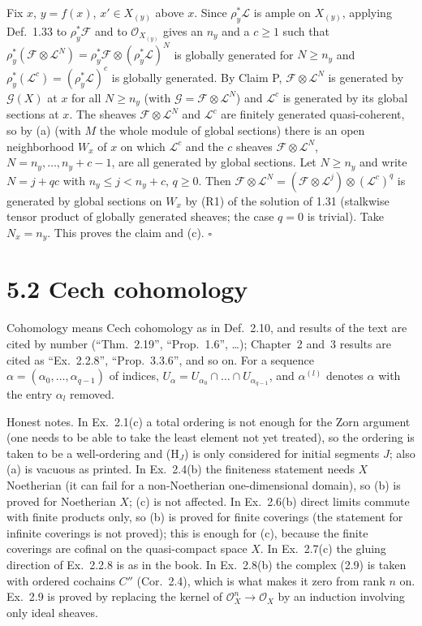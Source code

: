 \documentclass[11pt]{article}
\begin{document}
Fix $x$, $y=f(x)$, $x'\in X_{(y)}$ above $x$. Since $\rho_y^*\mathcal{L}$ is ample on $X_{(y)}$, applying Def.~1.33 to $\rho_y^*\mathcal{F}$ and to $\mathcal{O}_{X_{(y)}}$ gives an $n_y$ and a $c\ge1$ such that $\rho_y^*(\mathcal{F}\otimes\mathcal{L}^N)=\rho_y^*\mathcal{F}\otimes(\rho_y^*\mathcal{L})^N$ is globally generated for $N\ge n_y$ and $\rho_y^*(\mathcal{L}^c)=(\rho_y^*\mathcal{L})^c$ is globally generated. By Claim P, $\mathcal{F}\otimes\mathcal{L}^N$ is generated by $\mathcal{G}(X)$ at $x$ for all $N\ge n_y$ (with $\mathcal{G}=\mathcal{F}\otimes\mathcal{L}^N$) and $\mathcal{L}^c$ is generated by its global sections at $x$. The sheaves $\mathcal{F}\otimes\mathcal{L}^N$ and $\mathcal{L}^c$ are finitely generated quasi-coherent, so by (a) (with $M$ the whole module of global sections) there is an open neighborhood $W_x$ of $x$ on which $\mathcal{L}^c$ and the $c$ sheaves $\mathcal{F}\otimes\mathcal{L}^N$, $N=n_y,\dots,n_y+c-1$, are all generated by global sections. Let $N\ge n_y$ and write $N=j+qc$ with $n_y\le j<n_y+c$, $q\ge0$. Then $\mathcal{F}\otimes\mathcal{L}^N=(\mathcal{F}\otimes\mathcal{L}^j)\otimes(\mathcal{L}^c)^q$ is generated by global sections on $W_x$ by (R1) of the solution of 1.31 (stalkwise tensor product of globally generated sheaves; the case $q=0$ is trivial). Take $N_x=n_y$. This proves the claim and (c). \hfill$\square$

\section*{5.2 Cech cohomology}

Cohomology means Cech cohomology as in Def.~2.10, and results of the text are cited by number (``Thm.~2.19'', ``Prop.~1.6'', \dots); Chapter~2 and~3 results are cited as ``Ex.~2.2.8'', ``Prop.~3.3.6'', and so on. For a sequence $\alpha=(\alpha_0,\dots,\alpha_{q-1})$ of indices, $U_\alpha=U_{\alpha_0}\cap\dots\cap U_{\alpha_{q-1}}$, and $\alpha^{(l)}$ denotes $\alpha$ with the entry $\alpha_l$ removed.

Honest notes. In Ex.~2.1(c) a total ordering is not enough for the Zorn argument (one needs to be able to take the least element not yet treated), so the ordering is taken to be a well-ordering and (H$_J$) is only considered for initial segments $J$; also (a) is vacuous as printed. In Ex.~2.4(b) the finiteness statement needs $X$ Noetherian (it can fail for a non-Noetherian one-dimensional domain), so (b) is proved for Noetherian $X$; (c) is not affected. In Ex.~2.6(b) direct limits commute with finite products only, so (b) is proved for finite coverings (the statement for infinite coverings is not proved); this is enough for (c), because the finite coverings are cofinal on the quasi-compact space $X$. In Ex.~2.7(c) the gluing direction of Ex.~2.2.8 is as in the book. In Ex.~2.8(b) the complex (2.9) is taken with ordered cochains $C''$ (Cor.~2.4), which is what makes it zero from rank $n$ on. Ex.~2.9 is proved by replacing the kernel of $\mathcal O_X^n\to\mathcal O_X$ by an induction involving only ideal sheaves.
\end{document}
